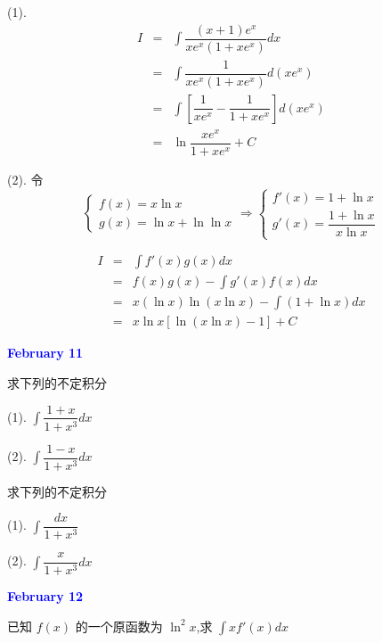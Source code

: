 \begin{solution}

	(1). 
	\begin{eqnarray*}
		I & = & \int \dfrac{(x+1)e^{x}}{xe^{x}(1+xe^{x})}dx\\
		  & = & \int \dfrac{1}{xe^{x}(1+xe^{x})}d(xe^{x})\\
		  & = & \int \left[\dfrac{1}{xe^{x}}-\dfrac{1}{1+xe^{x}}\right]d(xe^{x})\\
		  & = & \ln \dfrac{xe^{x}}{1+xe^{x}} +C
	\end{eqnarray*}

	(2). 令 
	$$\begin{cases}
		f(x) = x\ln x \\ 
		g(x) = \ln x+\ln \ln x
	\end{cases}\Rightarrow 
	\begin{cases} 
		f'(x) = 1+\ln x\\
		g'(x) = \dfrac{1+\ln x}{x\ln x}
	\end{cases}$$
	
	\begin{eqnarray*}
		I & = & \int f'(x)g(x)dx\\
		  & = & f(x)g(x) - \int g'(x)f(x)dx\\
		  & = & x(\ln x)\ln(x\ln x) - \int (1+\ln x)dx\\
		  & = & x\ln x\left[\ln(x\ln x) - 1 \right] + C
	\end{eqnarray*}
\end{solution}

\textcolor{blue}{\textbf{February 11}}
\begin{example}[][Exam: 28.2.7]
	求下列的不定积分

(1). $\int \dfrac{1+x}{1+x^{3}}dx$

(2). $\int \dfrac{1-x}{1+x^{3}}dx$
\end{example}

\begin{example}[][Exam: 28.2.8]
	求下列的不定积分

(1). $\int \dfrac{dx}{1+x^{3}}$

(2). $\int \dfrac{x}{1+x^{3}}dx$
\end{example}

\textcolor{blue}{\textbf{February 12}}

\begin{example}[][Exam: 28.2.9]
	已知 $f(x)$ 的一个原函数为 $\ln^{2}x$,求 $\int xf'(x)dx$
\end{example}

